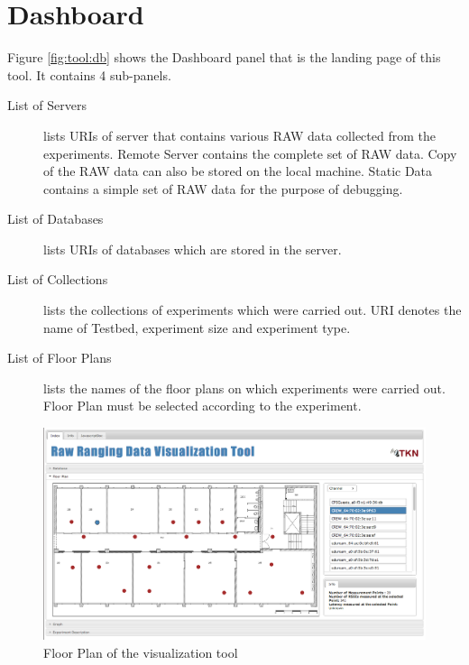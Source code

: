 \documentclass[11pt,a4paper,headinclude,footinclude,chapterprefix=on]{scrreprt}
\begin{document}
\section{Dashboard} Figure \ref{fig:tool:db} shows the Dashboard panel that is the landing page of this tool. It contains 4 sub-panels. 
\begin{description}
	\item[List of Servers] lists URIs of server that contains various RAW data collected from the experiments. Remote Server contains the complete set of RAW data. Copy of the RAW data can also be stored on the local machine. Static Data contains a simple set of RAW data for the purpose of debugging. 
	\item[List of Databases] lists URIs of databases which are stored in the server. 
	\item[List of Collections] lists the collections of experiments which were carried out. URI denotes the name of Testbed, experiment size and experiment type. 
	\item[List of Floor Plans] lists the names of the floor plans on which experiments were carried out. Floor Plan must be selected according to the experiment. 
\end{description}
\begin{figure}
	[!h] \centering 
	\includegraphics[width=13cm]{Images/tool_floor.png} \caption{Floor Plan of the visualization tool} \label{fig:tool:floor} 
\end{figure}
\end{document}
